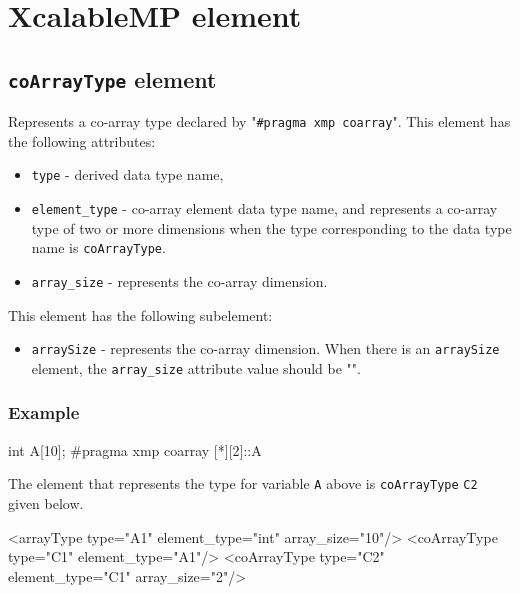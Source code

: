 \section{XcalableMP element}

\subsection{ {\tt coArrayType} element}

Represents a co-array type declared by "{\tt \#pragma xmp coarray}". This element has the following attributes:

\begin{itemize}
\item {\tt type} - derived data type name,
\item {\tt element\_type} - co-array element data type name, and
represents a co-array type of two or more dimensions when the type corresponding to the data type name is {\tt coArrayType}.
\item {\tt array\_size} - represents the co-array dimension.
\end{itemize}

This element has the following subelement:

\begin{itemize}
\item {\tt arraySize} - represents the co-array dimension.
When there is an {\tt arraySize} element, the {\tt array\_size} attribute value should be "{\tt *}". 
\end{itemize}

\subsubsection*{Example}
\vspace{1mm}

\begin{CExample}
int A[10];
#pragma xmp coarray [*][2]::A
\end{CExample}

The element that represents the type for variable {\tt A} above is {\tt coArrayType} {\tt C2} given below.
\vspace{2mm}

\begin{XcodeMLExample}
<arrayType type="A1" element_type="int" array_size="10"/>
<coArrayType type="C1" element_type="A1"/>
<coArrayType type="C2" element_type="C1" array_size="2"/>
\end{XcodeMLExample}


